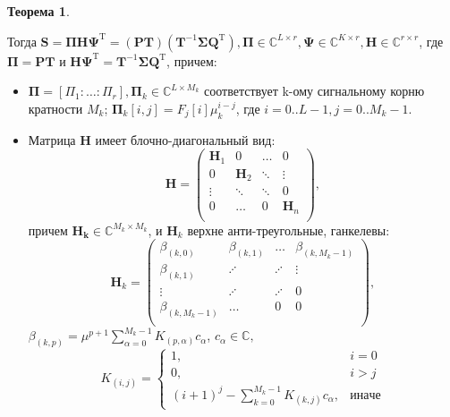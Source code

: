 \documentclass[specialist, substylefile = spbureport.rtx, subf,href,colorlinks=true, 12pt]{disser}
\theoremstyle{definition}
\newtheorem{theorem}{Теорема}
\begin{document}
\begin{theorem}
\begin{enumerate}
        Тогда $\mathbf{S} = \mathbf{\Pi H\Psi}^{\mathrm{T}} = (\mathbf{PT})(\mathbf{T}^{-1}\mathbf{\Sigma Q}^{\mathrm{T}}), \mathbf{\Pi} \in \mathbb{C}^{L \times r}, \mathbf{\Psi} \in \mathbb{C}^{K \times r}, \mathbf{H} \in \mathbb{C}^{r \times r}$, где $\mathbf{\Pi} = \mathbf{PT}$ и $\mathbf{H\Psi}^{\mathrm{T}} = \mathbf{T}^{-1}\mathbf{\Sigma Q}^{\mathrm{T}}$, причем:
        \begin{itemize}
            \item $\mathbf{\Pi} = [\Pi_1: \ldots :\Pi_r], \mathbf{\Pi}_k \in \mathbb{C}^{L \times M_k}$ соответствует k-ому сигнальному корню кратности $M_k$; $\mathbf{\Pi}_k[i, j] = F_j[i]\mu_k^{i - j}$, где $i = 0..L-1, j = 0..M_k-1$.
            \item Матрица $\mathbf{H}$ имеет блочно-диагональный вид:
            \begin{equation*}
                \mathbf{H} = \begin{pmatrix}
                    \mathbf{H}_1 & 0 & \ldots & 0\\
                    0 & \mathbf{H}_2 & \ddots & \vdots \\
                    \vdots & \ddots & \ddots & 0 \\
                    0 & \ldots & 0 & \mathbf{H}_n \\
                    \end{pmatrix},
            \end{equation*}
            причем $\mathbf{H_k} \in \mathbb{C}^{M_k \times M_k}$, и $\mathbf{H}_k$ верхне анти-треугольные, ганкелевы:
            \begin{equation*}
                \mathbf{H}_k = \begin{pmatrix}
                    \beta _{(k, 0)} & \beta _{(k, 1)} & \ldots & \beta _{(k, M_k - 1)}\\
                    \beta _{(k, 1)} & \iddots & \iddots & \vdots \\
                    \vdots & \iddots & \iddots & 0 \\
                    \beta _{(k, M_k - 1)} & \ldots & 0 & 0 \\
                    \end{pmatrix},
            \end{equation*}
            $\beta_{(k, p)} = \mu^{p + 1} \sum_{\alpha = 0}^{M_k - 1}K_{(p, \alpha)}c_{\alpha}$, $c_{\alpha} \in \mathbb{C},$
            \begin{equation*}
                K_{(i, j)} = \begin{cases}
                1, & i = 0 \\
                0, & i > j \\
                (i + 1)^j - \sum_{k = 0}^{M_k - 1}K_{(k, j)}c_{\alpha}, & иначе
                \end{cases}
            \end{equation*}


\end{itemize}
\end{enumerate}
\end{theorem}
\end{document}
